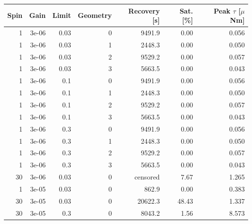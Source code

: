 \begin{tabular}{rrrrrrr}
\hline
Spin & Gain & Limit & Geometry & Recovery [s] & Sat. [\%] & Peak $\tau$ [$\mu$Nm] \\
\hline
1 & 3e-06 & 0.03 & 0 & 9491.9 & 0.00 & 0.056 \\
1 & 3e-06 & 0.03 & 1 & 2448.3 & 0.00 & 0.050 \\
1 & 3e-06 & 0.03 & 2 & 9529.2 & 0.00 & 0.057 \\
1 & 3e-06 & 0.03 & 3 & 5663.5 & 0.00 & 0.043 \\
1 & 3e-06 & 0.1 & 0 & 9491.9 & 0.00 & 0.056 \\
1 & 3e-06 & 0.1 & 1 & 2448.3 & 0.00 & 0.050 \\
1 & 3e-06 & 0.1 & 2 & 9529.2 & 0.00 & 0.057 \\
1 & 3e-06 & 0.1 & 3 & 5663.5 & 0.00 & 0.043 \\
1 & 3e-06 & 0.3 & 0 & 9491.9 & 0.00 & 0.056 \\
1 & 3e-06 & 0.3 & 1 & 2448.3 & 0.00 & 0.050 \\
1 & 3e-06 & 0.3 & 2 & 9529.2 & 0.00 & 0.057 \\
1 & 3e-06 & 0.3 & 3 & 5663.5 & 0.00 & 0.043 \\
30 & 3e-06 & 0.03 & 0 & censored & 7.67 & 1.265 \\
1 & 3e-05 & 0.03 & 0 & 862.9 & 0.00 & 0.383 \\
30 & 3e-05 & 0.03 & 0 & 20622.3 & 48.43 & 1.337 \\
30 & 3e-05 & 0.3 & 0 & 8043.2 & 1.56 & 8.573 \\
\hline
\end{tabular}
